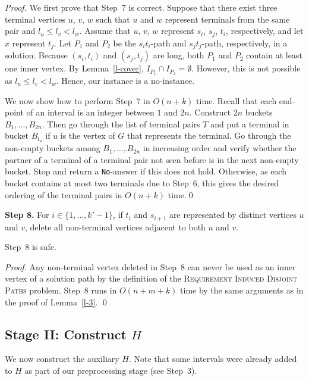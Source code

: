 \documentclass{llncs}
\newcommand{\problemRIDP}{\textsc{Requirement Induced Disjoint Paths}}
\begin{document}
\begin{proof}
We first prove that Step~7 is correct.
Suppose that there exist three terminal vertices $u$, $v$, $w$ such that $u$ and $w$ represent terminals from 
the same pair and $l_u\leq l_v<l_w$. Assume that $u$, $v$, $w$ represent $s_i$, $s_j$, $t_i$, respectively, and
let $x$ represent $t_j$.
Let $P_1$ and $P_2$ be the $s_it_i$-path and $s_jt_j$-path, respectively, in a solution. 
Because $(s_i,t_i)$ and $(s_j,t_j)$ are long, both $P_1$ and $P_2$ contain at least one inner vertex.
By Lemma~\ref{l-cover}, 
$I_{P_1}\cap I_{P_2}=\emptyset$. However, this is not possible as $l_u\leq l_v<l_w$. Hence, our instance is a no-instance.

We now show how to perform Step~7 in $O(n+k)$ time. 
Recall that each end-point of an interval is an integer between $1$ and $2n$. Construct $2n$ buckets $B_1,\ldots,B_{2n}$. Then  go through the list of terminal pairs $T$ and put a terminal in bucket $B_{l_u}$ if $u$ is the vertex of $G$ that represents the terminal.
Go through the non-empty buckets among $B_{1},\ldots,B_{2n}$ in increasing order and verify 
whether the partner of a terminal of a terminal pair not seen before is in the next non-empty bucket.
Stop and return a \texttt{No}-answer if this does not hold. Otherwise, as each bucket contains at most two terminals due to Step~6, this gives the desired ordering of the terminal pairs in $O(n+k)$ time.\qed
\end{proof}

\noindent
{\bf Step 8.}
For $i\in\{1,\ldots,k'-1\}$, if $t_i$ and $s_{i+1}$ are represented by distinct vertices $u$ and $v$,  delete all non-terminal vertices adjacent to both $u$ and $v$.

\begin{lemma}\label{l-8}
Step~8 is safe.
\end{lemma}

\begin{proof}
Any non-terminal vertex deleted in Step~8 can never be used as an inner vertex of a solution path by the definition of the \problemRIDP{} problem.
Step~8 runs in $O(n+m+k)$ time by the same arguments as in the proof of Lemma~\ref{l-3}.
\qed
\end{proof} 

\subsection{Stage II: Construct $H$}
We now construct the auxiliary $H$. Note that some intervals were already added to $H$ as part of our preprocessing stage (see Step~3).
\end{document}
